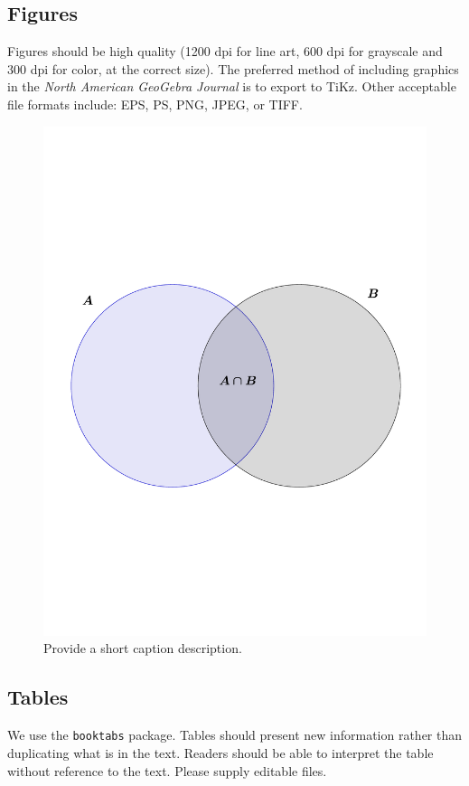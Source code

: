  \subsection*{Figures}
Figures should be high quality (1200 dpi for line art, 600 dpi for grayscale and 300 dpi for color, at the correct size). The preferred method of including graphics in the \textit{North American GeoGebra Journal} is to export to TiKz. Other acceptable file formats include: EPS, PS, PNG, JPEG, or TIFF.  
  
 \begin{figure}[h!] %
    \centering
    \includegraphics[scale=0.5]{figs/venn.pdf} 
    \caption{Provide a short caption description.}
    \label{fig:number}
 \end{figure}
 
 
\subsection*{Tables}
We use the \texttt{booktabs} package.  Tables should present new information rather than duplicating what is in the text. Readers should be able to interpret the table without reference to the text. Please supply editable files.


